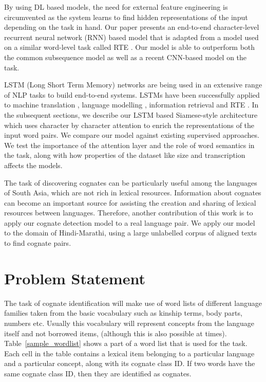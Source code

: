 \documentclass[11pt,letterpaper]{article}
\begin{document}

By using DL based models, the need for external feature engineering is circumvented as the system learns to find hidden representations of the input depending on the task in hand. Our paper presents an end-to-end character-level recurrent neural network (RNN) based model that is adapted from a model used on a similar word-level task called RTE \cite{rocktaschel2016reasoning}. Our model is able to outperform both the common subsequence model \cite{rama2015automatic} as well as a recent CNN-based model \cite{rama2016siamese} on the task. 

LSTM (Long Short Term Memory) networks are being used in an extensive range of NLP tasks to build end-to-end systems. LSTMs have been successfully applied to machine translation \cite{bahdanau2014neural}, language modelling \cite{mikolov2010recurrent}, information retrieval \cite{sordoni2015hierarchical} and RTE \cite{snli:emnlp2015}. In the subsequent sections, we describe our LSTM based Siamese-style architecture which uses character by character attention to enrich the representations of the input word pairs. We compare our model against existing supervised approaches. We test the importance of the attention layer and the role of word semantics in the task, along with how properties of the dataset like size and transcription affects the models.

The task of discovering cognates can be particularly useful among the languages of South Asia, which are not rich in lexical resources. Information about cognates can become an important source for assisting the creation and sharing of lexical resources between languages. Therefore, another contribution of this work is to apply our cognate detection model to a real language pair. We apply our model to the domain of Hindi-Marathi, using a large unlabelled corpus of aligned texts to find cognate pairs.

\section{Problem Statement}

The task of cognate identification will make use of word lists of different language families taken from the basic vocabulary such as kinship terms, body parts, numbers etc. Usually this vocabulary will represent concepts from the language itself and not borrowed items, (although this is also possible at times). Table~\ref{sample_wordlist} shows a part of a word list that is used for the task. Each cell in the table contains a lexical item belonging to a particular language and a particular concept, along with its cognate class ID. If two words have the same cognate class ID, then they are identified as cognates.
\end{document}
